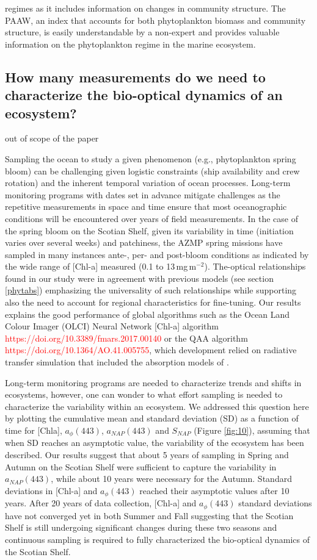 \documentclass[utf8]{frontiersSCNS} %
\begin{document}
regimes as it includes information on changes in community structure. The PAAW, an index that accounts for both phytoplankton biomass and community structure, is easily understandable by a non-expert and provides valuable information on the phytoplankton regime in the marine ecosystem. 


\subsection{How many measurements do we need to characterize the bio-optical dynamics of an ecosystem?} out of scope of the paper

Sampling the ocean to study a given phenomenon (e.g., phytoplankton spring bloom) can be challenging given logistic constraints (ship availability and crew rotation) and the inherent temporal variation of ocean processes. Long-term monitoring programs with dates set in advance mitigate challenges as the repetitive measurements in space and time ensure that most oceanographic conditions will be encountered over years of field measurements. In the case of the spring bloom on the Scotian Shelf, given its variability in time (initiation varies over several weeks) and patchiness, the AZMP spring missions have sampled in many instances ante-, per- and post-bloom conditions as indicated by the wide range of [Chl-a] measured (0.1 to 13\,mg\,m$^{-2}$). The-optical relationships found in our study were in agreement with previous models (see section \ref{phytabs}) emphasizing the universality of such relationships while supporting also the need to account for regional characteristics for fine-tuning. Our results explains the good performance of global algorithms such as the Ocean Land Colour Imager (OLCI) Neural Network [Chl-a] algorithm \citep{hieronymi2017} \textcolor{red}{https://doi.org/10.3389/fmars.2017.00140} or the QAA algorithm \citep{lee2002} \textcolor{red}{https://doi.org/10.1364/AO.41.005755}, which development relied on radiative transfer simulation that included the absorption models of \cite{bricaud1995,bricaud1998,bricaud2004}. 

Long-term monitoring programs are needed to characterize trends and shifts in ecosystems, however, one can wonder to what effort sampling is needed to characterize the variability within an ecosystem. We addressed this question here by plotting the cumulative mean and standard deviation (SD) as a function of time for [Chla], $a_\phi(443)$, $a_{NAP}(443)$ and $S_{NAP}$
(Figure \ref{fig:10}), assuming that when SD reaches an asymptotic value, the variability of the ecosystem has been described. Our results suggest that about 5 years of sampling in Spring and Autumn on the Scotian Shelf were sufficient to capture the variability in $a_{NAP}(443)$, while about 10 years were necessary for the Autumn. Standard deviations in [Chl-a] and $a_\phi(443)$ reached their asymptotic values after 10 years. After 20 years of data collection, [Chl-a] and $a_\phi(443)$ standard deviations have not converged yet in both Summer and Fall suggesting that the Scotian Shelf is still undergoing significant changes during these two seasons and continuous sampling is required to fully characterized the bio-optical dynamics of the Scotian Shelf. 
\end{document}
